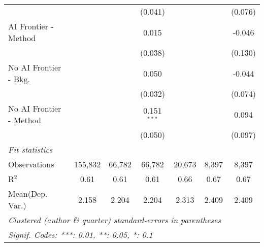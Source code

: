 \begin{tabular}{lcccccc}
                           &               &               & (0.041)       &              &               & (0.076)\\   
   AI Frontier - Method    &               &               & 0.015         &              &               & -0.046\\   
                           &               &               & (0.038)       &              &               & (0.130)\\   
   No AI Frontier - Bkg.   &               &               & 0.050         &              &               & -0.044\\   
                           &               &               & (0.032)       &              &               & (0.074)\\   
   No AI Frontier - Method &               &               & 0.151$^{***}$ &              &               & 0.094\\   
                           &               &               & (0.050)       &              &               & (0.097)\\   
   \midrule
   \emph{Fit statistics}\\
   Observations            & 155,832       & 66,782        & 66,782        & 20,673       & 8,397         & 8,397\\  
   R$^2$                   & 0.61          & 0.61          & 0.61          & 0.66         & 0.67          & 0.67\\  
Mean(Dep. Var.) & 2.158 & 2.204 & 2.204 & 2.313 & 2.409 & 2.409 \\
   \midrule \midrule
   \multicolumn{7}{l}{\emph{Clustered (author \& quarter) standard-errors in parentheses}}\\
   \multicolumn{7}{l}{\emph{Signif. Codes: ***: 0.01, **: 0.05, *: 0.1}}\\
\end{tabular}
\par\endgroup
